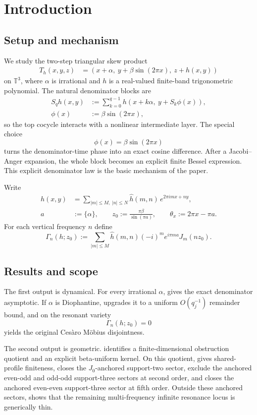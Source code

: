 \documentclass[11pt,reqno]{amsart}
\theoremstyle{definition}
\newcommand{\T}{\mathbb{T}}
\newcommand{\e}[1]{e^{2\pi i #1}}
\newcommand{\abs}[1]{\left\lvert #1 \right\rvert}
\newcommand{\qj}{q_j}
\begin{document}
\section{Introduction}

\subsection{Setup and mechanism}

We study the two-step triangular skew product
\[
\begin{aligned}
T_h(x,y,z)
&=(x+\alpha,\ y+\beta\sin(2\pi x),\ z+h(x,y))
\end{aligned}
\]
on $\T^3$, where $\alpha$ is irrational and $h$ is a real-valued finite-band trigonometric
polynomial. The natural denominator blocks are
\[
\begin{aligned}
S_q h(x,y)
&:=\sum_{k=0}^{q-1} h(x+k\alpha,\ y+S_k\phi(x)),\\
\phi(x)&:=\beta\sin(2\pi x),
\end{aligned}
\]
so the top cocycle interacts with a nonlinear intermediate layer. The special choice
\[
\phi(x)=\beta\sin(2\pi x)
\]
turns the denominator-time phase into an exact cosine difference. After a Jacobi--Anger
expansion, the whole block becomes an explicit finite Bessel expression. This explicit
denominator law is the basic mechanism of the paper.

Write
\[
\begin{aligned}
h(x,y)
&=\sum_{\abs{m}\le M,\ \abs{n}\le N}\widehat h(m,n)\,\e{mx+ny},\\
a&:=\{\alpha\},\qquad
z_0:=\frac{\pi\beta}{\sin(\pi a)},\qquad
\theta_x:=2\pi x-\pi a.
\end{aligned}
\]
For each vertical frequency $n$ define
\[
\Gamma_n(h;z_0)
:=
\sum_{\abs{m}\le M}\widehat h(m,n)(-i)^m e^{i\pi m a} J_m(n z_0).
\]

\subsection{Results and scope}

The first output is dynamical. For every irrational $\alpha$,  gives the
exact denominator asymptotic. If $\alpha$ is Diophantine, 
upgrades it to a uniform $O(\qj^{-1})$ remainder bound, and on the resonant variety
\[
\Gamma_n(h;z_0)=0
\]
 yields the original Ces\`aro M\"obius disjointness.

The second output is geometric.  identifies a finite-dimensional
obstruction quotient and an explicit beta-uniform kernel. On this quotient,
 gives shared-profile finiteness,
 closes the $J_0$-anchored support-two sector,
exclude the anchored even-odd and odd-odd support-three sectors at second order, and
 closes the anchored even-even support-three sector at
fifth order. Outside these anchored sectors,  shows that the
remaining multi-frequency infinite resonance locus is generically thin.
\end{document}
